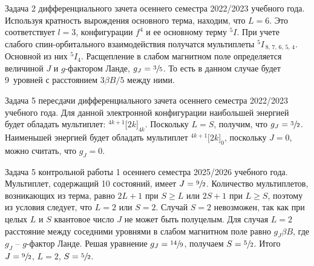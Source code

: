  Задача 2 дифференциального зачета осеннего семестра 2022/2023 учебного года. Используя кратность вырождения основного терма, находим, что $L=6$. Это соответствует $l=3$, конфигурации $f^4$ и ее основному терму $^5I$. При учете слабого спин-орбитального взаимодействия получатся мультиплеты $^5I_{\,8,\,7,\,6,\,5,\,4}$. Основной из них $^5I_4$. Расщепление в слабом магнитном поле определяется величиной $J$ и $g$-фактором Ланде, $g_J=\sfrac35$. То есть в данном случае будет 9~уровней с расстоянием $3 \beta B/5$ между ними.\par
{} Задача 5 пересдачи дифференциального зачета осеннего семестра 2022/2023 учебного года. Для данной электронной конфигурации наибольшей энергией будет обладать мультиплет: $^{4k+1}\Big[ 2k \Big] _{4k}$. Поскольку $L=S$, получим, что $g_{J} = \sfrac{3}{2}$. Наименьшей энергией будет обладать мультиплет $^{4k+1}\Big[ 2k \Big] _{0}$, поскольку $J=0$, можно считать, что $g_{J}=0$.\par
{} Задача 5 контрольной работы 1 осеннего семестра 2025/2026 учебного года. Мультиплет, содержащий 10 состояний, имеет $J=\sfrac92$. Количество мультиплетов, возникающих из терма, равно $2L+1$ при $S \geq L$ или $2S+1$ при $L \geq S$, поэтому из условия следует, что $L=2$ или $S=2$. Случай $S=2$ невозможен, так как при целых $L$ и $S$ квантовое число $J$ не может быть полуцелым. Для случая $L=2$ расстояние между соседними уровнями в слабом магнитном поле равно $g_J \beta B$, где $g_J$ – $g$-фактор Ланде. Решая уравнение $g_J=\sfrac{14}{9}$, получаем $S=\sfrac52$. Итого $J=\sfrac92$, $L=2$, $S=\sfrac52$.\par
\newpage

